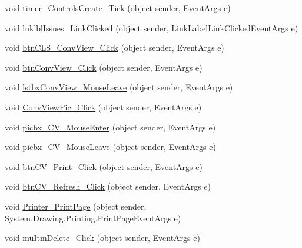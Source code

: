 \begin{DoxyCompactItemize}
\item 
void \hyperlink{class_sr_p___classroom_inq_1_1frm_classrrom_inq_af03934d96e1bb39c2a01e4f766ed8702}{timer\-\_\-\-Controls\-Create\-\_\-\-Tick} (object sender, \-Event\-Args e)
\item 
void \hyperlink{class_sr_p___classroom_inq_1_1frm_classrrom_inq_ab250baad97d73c003a671693f24aaf0a}{lnklbl\-Issues\-\_\-\-Link\-Clicked} (object sender, \-Link\-Label\-Link\-Clicked\-Event\-Args e)
\item 
void \hyperlink{class_sr_p___classroom_inq_1_1frm_classrrom_inq_ac16e7e664d136fcd9a2322bdae21b8b4}{btn\-C\-L\-S\-\_\-\-Conv\-View\-\_\-\-Click} (object sender, \-Event\-Args e)
\item 
void \hyperlink{class_sr_p___classroom_inq_1_1frm_classrrom_inq_aba872e01b5d503de6b2311405850549c}{btn\-Conv\-View\-\_\-\-Click} (object sender, \-Event\-Args e)
\item 
void \hyperlink{class_sr_p___classroom_inq_1_1frm_classrrom_inq_a89e7441c50059838d9acbea2073c70c9}{lstbx\-Conv\-View\-\_\-\-Mouse\-Leave} (object sender, \-Event\-Args e)
\item 
void \hyperlink{class_sr_p___classroom_inq_1_1frm_classrrom_inq_a47059fedf8a6d360fecf6723d0800aba}{\-Conv\-View\-Pic\-\_\-\-Click} (object sender, \-Event\-Args e)
\item 
void \hyperlink{class_sr_p___classroom_inq_1_1frm_classrrom_inq_aa87dbf334dcda09f2f4f447f1aeead56}{picbx\-\_\-\-C\-V\-\_\-\-Mouse\-Enter} (object sender, \-Event\-Args e)
\item 
void \hyperlink{class_sr_p___classroom_inq_1_1frm_classrrom_inq_a7729ac7ccc616c9623c0aa38929d1ad9}{picbx\-\_\-\-C\-V\-\_\-\-Mouse\-Leave} (object sender, \-Event\-Args e)
\item 
void \hyperlink{class_sr_p___classroom_inq_1_1frm_classrrom_inq_a58d2c5f78600a8bb93743a3eb399a0c0}{btn\-C\-V\-\_\-\-Print\-\_\-\-Click} (object sender, \-Event\-Args e)
\item 
void \hyperlink{class_sr_p___classroom_inq_1_1frm_classrrom_inq_a4ca2a2e4d7fb919dbcedf7634b6b835a}{btn\-C\-V\-\_\-\-Refresh\-\_\-\-Click} (object sender, \-Event\-Args e)
\item 
void \hyperlink{class_sr_p___classroom_inq_1_1frm_classrrom_inq_a79e2df939051406824a37f0daea3e5d4}{\-Printer\-\_\-\-Print\-Page} (object sender, \-System.\-Drawing.\-Printing.\-Print\-Page\-Event\-Args e)
\item 
void \hyperlink{class_sr_p___classroom_inq_1_1frm_classrrom_inq_a39aaad15d2ebcbb4f4e65b7c63db4d67}{mu\-Itm\-Delete\-\_\-\-Click} (object sender, \-Event\-Args e)

\end{DoxyCompactItemize}
